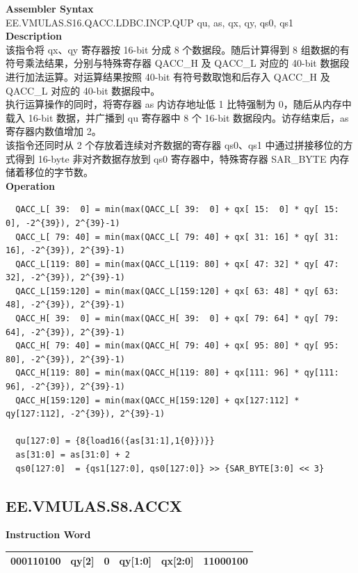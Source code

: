 \textbf{Assembler Syntax} \\
EE.VMULAS.S16.QACC.LDBC.INCP.QUP qu, as, qx, qy, qs0, qs1 \\
\textbf{Description} \\
该指令将 qx、qy 寄存器按 16-bit 分成 8 个数据段。随后计算得到 8 组数据的有符号乘法结果，分别与特殊寄存器 QACC\_H 及 QACC\_L 对应的 40-bit 数据段进行加法运算。对运算结果按照 40-bit 有符号数取饱和后存入 QACC\_H 及 QACC\_L 对应的 40-bit 数据段中。\\
执行运算操作的同时，将寄存器 as 内访存地址低 1 比特强制为 0，随后从内存中载入 16-bit 数据，并广播到 qu 寄存器中 8 个 16-bit 数据段内。访存结束后，as 寄存器内数值增加 2。\\
该指令还同时从 2 个存放着连续对齐数据的寄存器 qs0、qs1 中通过拼接移位的方式得到 16-byte 非对齐数据存放到 qs0 寄存器中，特殊寄存器 SAR\_BYTE 内存储着移位的字节数。\\
\textbf{Operation}
\begin{lstlisting}
  QACC_L[ 39:  0] = min(max(QACC_L[ 39:  0] + qx[ 15:  0] * qy[ 15:  0], -2^{39}), 2^{39}-1)
  QACC_L[ 79: 40] = min(max(QACC_L[ 79: 40] + qx[ 31: 16] * qy[ 31: 16], -2^{39}), 2^{39}-1)
  QACC_L[119: 80] = min(max(QACC_L[119: 80] + qx[ 47: 32] * qy[ 47: 32], -2^{39}), 2^{39}-1)
  QACC_L[159:120] = min(max(QACC_L[159:120] + qx[ 63: 48] * qy[ 63: 48], -2^{39}), 2^{39}-1)
  QACC_H[ 39:  0] = min(max(QACC_H[ 39:  0] + qx[ 79: 64] * qy[ 79: 64], -2^{39}), 2^{39}-1)
  QACC_H[ 79: 40] = min(max(QACC_H[ 79: 40] + qx[ 95: 80] * qy[ 95: 80], -2^{39}), 2^{39}-1)
  QACC_H[119: 80] = min(max(QACC_H[119: 80] + qx[111: 96] * qy[111: 96], -2^{39}), 2^{39}-1)
  QACC_H[159:120] = min(max(QACC_H[159:120] + qx[127:112] * qy[127:112], -2^{39}), 2^{39}-1)

  qu[127:0] = {8{load16({as[31:1],1{0}})}}
  as[31:0] = as[31:0] + 2
  qs0[127:0]  = {qs1[127:0], qs0[127:0]} >> {SAR_BYTE[3:0] << 3}
\end{lstlisting}

\clearpage
\subsection{EE.VMULAS.S8.ACCX}\label{instruction:EEVMULASS8ACCX}
\setlength\tabcolsep{6pt}
\textbf{Instruction Word} \\
\begin{tabular}{|c|c|c|c|c|c|}
	\hline
	000110100 & qy[2] & 0 & qy[1:0] & qx[2:0] & 11000100 \\
	\hline
\end{tabular}

